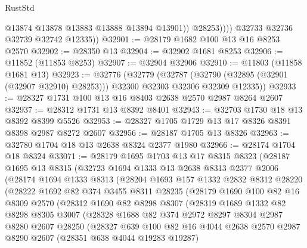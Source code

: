 \begin{lexlean}{RustStd}
\begin{coremodule}
                    @13874
                    @13878
                    @13883
                    @13888
                    @13894
                    @13901))
                @28253))))
        @32733
        @32736
        @32739
        @32742
        @12335))
@32901 := @28179 @1682 @100 @13 @16 @8253 @2570
@32902 := @28350 @13
@32904 := @32902 @1681 @8253
@32906 := @11852 (@11853 @8253)
@32907 := @32904 @32906
@32910 := @11803 (@11858 @1681 @13)
@32923 := @32776
    (@32779
      (@32787 (@32790 (@32895 (@32901 (@32907 @32910) @28253))) @32300 @32303 @32306 @32309 @12335))
@32933 := @28327 @1731 @100 @13 @16 @8403 @2638 @2570 @2987 @8264 @2607
@32937 := @28312 @1731 @13 @8392 @8401
@32943 := @32703 @1730 @18 @13 @8392 @8399 @5526
@32953 := @28327 @1705 @1729 @13 @17 @8326 @8391 @8398 @2987 @8272 @2607
@32956 := @28187 @1705 @13 @8326
@32963 := @32780 @1704 @18 @13 @2638 @8324 @2377 @1980
@32966 := @28174 @1704 @18 @8324
@33071 := @28179
    @1695
    @1703
    @13
    @17
    @8315
    @8323
    (@28187
      @1695
      @13
      @8315
      (@32723
        @1694
        @1333
        @13
        @2638
        @8313
        @2377
        @2006
        (@28174
          @1694
          @1333
          @8313
          (@28204
            @1693
            @157
            @1332
            @2832
            @8312
            @28220
            (@28222
              @1692
              @82
              @374
              @3455
              @8311
              @28235
              (@28179
                @1690
                @100
                @82
                @16
                @8309
                @2570
                (@28312
                  @1690
                  @82
                  @8298
                  @8307
                  (@28319
                    @1689
                    @1332
                    @82
                    @8298
                    @8305
                    @3007
                    (@28328
                      @1688
                      @82
                      @374
                      @2972
                      @8297
                      @8304
                      @2987
                      @8280
                      @2607
                      @28250
                      (@28327
                        @639
                        @100
                        @82
                        @16
                        @4044
                        @2638
                        @2570
                        @2987
                        @8290
                        @2607
                        (@28351 @638 @4044 @19283 @19287)

\end{coremodule}
\end{lexlean}
